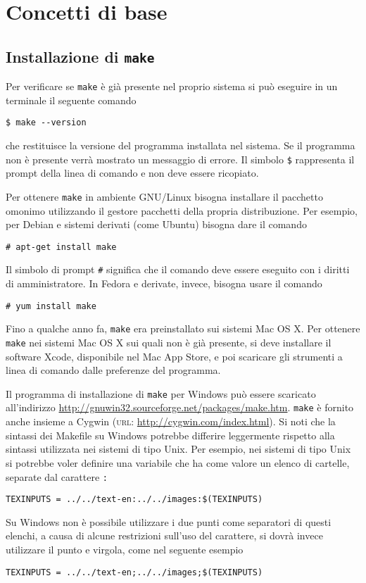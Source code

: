 \cleardoublepage{}
\chapter{Concetti di base}
\label{cha:concetti-base}

\section{Installazione di \texttt{make}}
\label{sec:installazione}

Per verificare se \texttt{make} è già presente nel proprio sistema si può
eseguire in un terminale il seguente comando
\begin{verbatim}
$ make --version
\end{verbatim}
che restituisce la versione del programma installata nel sistema.  Se il
programma non è presente verrà mostrato un messaggio di errore.  Il simbolo
\texttt{\$} rappresenta il prompt della linea di comando e non deve essere
ricopiato.

Per ottenere \texttt{make} in ambiente GNU/Linux bisogna installare il pacchetto
omonimo utilizzando il gestore pacchetti della propria distribuzione.  Per
esempio, per Debian e sistemi derivati (come Ubuntu) bisogna dare il comando
\begin{verbatim}
# apt-get install make
\end{verbatim}
Il simbolo di prompt \texttt{\#} significa che il comando deve essere eseguito
con i diritti di amministratore.  In Fedora e derivate, invece, bisogna usare
il comando
\begin{verbatim}
# yum install make
\end{verbatim}

Fino a qualche anno fa, \texttt{make} era preinstallato sui sistemi Mac OS X.
Per ottenere \texttt{make} nei sistemi Mac OS X sui quali non è già presente,
si deve installare il software Xcode, disponibile nel Mac App Store, e poi
scaricare gli strumenti a linea di comando dalle preferenze del programma.

Il programma di installazione di \texttt{make} per Windows può essere scaricato
all'indirizzo \url{http://gnuwin32.sourceforge.net/packages/make.htm}.
\texttt{make} è fornito anche insieme a Cygwin (\textsc{url}:
\url{http://cygwin.com/index.html}).  Si noti che la sintassi dei Makefile su
Windows potrebbe differire leggermente rispetto alla sintassi utilizzata nei
sistemi di tipo Unix.  Per esempio, nei sistemi di tipo Unix si potrebbe voler
definire una variabile che ha come valore un elenco di cartelle, separate dal
carattere \texttt{:}
\begin{verbatim}
TEXINPUTS = ../../text-en:../../images:$(TEXINPUTS)
\end{verbatim}
Su Windows non è possibile utilizzare i due punti come separatori di questi
elenchi, a causa di alcune restrizioni sull'uso del carattere, si dovrà invece
utilizzare il punto e virgola, come nel seguente esempio
\begin{verbatim}
TEXINPUTS = ../../text-en;../../images;$(TEXINPUTS)
\end{verbatim}

